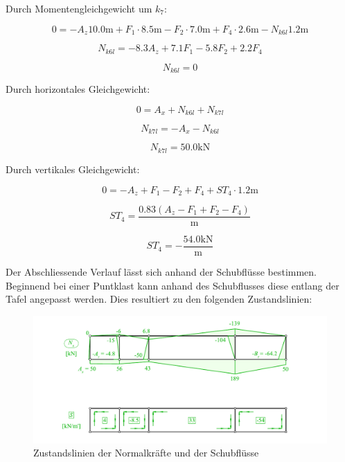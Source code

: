 \documentclass[
  12pt,
  letterpaper,
  DIV=11,
  egregdoesnotlikesansseriftitles]{scrartcl}
\begin{document}
Durch Momentengleichgewicht um \(k_{7}\):

\begin{equation}0 = - A_{z} 10.0 \text{m} + F_{1} \cdot 8.5 \text{m} - F_{2} \cdot 7.0 \text{m} + F_{4} \cdot 2.6 \text{m} - N_{k6l} 1.2 \text{m}\end{equation}

\begin{equation}N_{k6l} = - 8.3 A_{z} + 7.1 F_{1} - 5.8 F_{2} + 2.2 F_{4}\end{equation}

\begin{equation}N_{k6l} = 0\end{equation}

Durch horizontales Gleichgewicht:

\begin{equation}0 = A_{x} + N_{k6l} + N_{k7l}\end{equation}

\begin{equation}N_{k7l} = - A_{x} - N_{k6l}\end{equation}

\begin{equation}N_{k7l} = 50.0 \text{k} \text{N}\end{equation}

Durch vertikales Gleichgewicht:

\begin{equation}0 = - A_{z} + F_{1} - F_{2} + F_{4} + ST_{4} \cdot 1.2 \text{m}\end{equation}

\begin{equation}ST_{4} = \frac{0.83 \left(A_{z} - F_{1} + F_{2} - F_{4}\right)}{\text{m}}\end{equation}

\begin{equation}ST_{4} = - \frac{54.0 \text{k} \text{N}}{\text{m}}\end{equation}

Der Abschliessende Verlauf lässt sich anhand der Schubflüsse bestimmen.
Beginnend bei einer Puntklast kann anhand des Schubflusses diese entlang
der Tafel angepasst werden. Dies resultiert zu den folgenden
Zustandslinien:

\begin{figure}[H]

{\centering \includegraphics{BSI_HS23_Testat_03_files/mediabag/../images/Testat_03_HS23_N_S.pdf}

}

\caption{\label{fig-ZS_N_S}Zustandslinien der Normalkräfte und der
Schubflüsse}

\end{figure}
\end{document}
